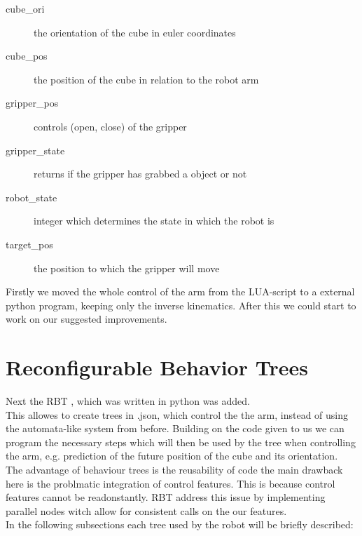 \documentclass[report]{iisthesis}
\begin{document}
\begin{description}
    \item [cube\_ori] the orientation of the cube in euler coordinates 
    \item [cube\_pos] the position of the cube in relation to the robot arm
    \item [gripper\_pos] controls (open, close) of the gripper
    \item [gripper\_state] returns if the gripper has grabbed a object or not
    \item [robot\_state] integer which determines the state in which the robot is 
    \item [target\_pos] the position to which the gripper will move
\end{description}
\noindent
Firstly we moved the whole control of the arm from the LUA-script to a external python program, keeping only the inverse kinematics.
After this we could start to work on our suggested improvements. 

\section{Reconfigurable Behavior Trees}
Next the RBT \cite{DBLP:journals/corr/abs-2007-10663}, which was written in python was added. \\
This allowes to create trees in .json, which control the the arm, instead of using the automata-like system
from before.
Building on the code given to us we can program the necessary steps which will then be used by the tree when controlling the arm, e.g. prediction of
the future position of the cube and its orientation. \\
The advantage of behaviour trees is the reusability of code the main drawback here is the problmatic integration of control features. \cite{DBLP:journals/corr/abs-2007-10663}
This is because control features cannot be readonstantly.
RBT address this issue by implementing parallel nodes witch allow for consistent calls on the our features. \\
In the following subsections each tree used by the robot will be briefly described:
\end{document}
